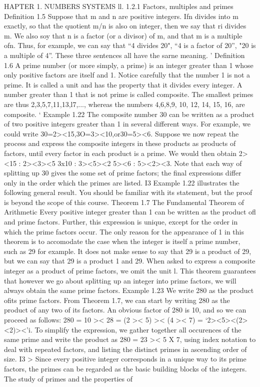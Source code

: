 HAPTER 1. NUMBERS SYSTEMS ll.
1.2.1 Factors, multiples and primes
Deﬁnition 1.5 Suppose that m and n are positive integers. Ifn divides into m exactly, so that
the quotient m/n is also on integer, then we say that ri divides m. We also soy that n is a factor
(or a divisor) of m, and that m is a multiple ofn.
Thus, for example, we can say that “4 divides 20", “4 is a factor of 20”, "20 is a multiple of 4”.
These three sentences all have the sarne meaning. '
Deﬁnition 1.6 A prime number (or more simply, a prime) is an integer greater than 1 whose
only positive factors are itself and 1.
Notice carefully that the number 1 is not a prime. It is called a unit and has the property that
it divides every integer. A number greater than 1 that is not prime is called composite. The
smallest primes are thus 2,3,5,7,11,13,l7,..., whereas the numbers 4,6,8,9, 10, 12, 14, 15, 16, 
are composite. ‘
Example 1.22 The composite number 30 can be written as a product of two positive integers
greater than 1 in several different ways. For example, we could write
30=2><15,3O=3><10,or30=5><6.
Suppose we now repeat the process and express the composite integers in these products as products
of factors, until every factor in each product is a prime. We would then obtain
2><15 : 2><3><5
3x10 : 3><5><2
5><6 : 5><2><3.
Note that each way of splitting up 30 gives the some set of prime factors; the ﬁnal expressions
differ only in the order which the primes are listed. I3
Example 1.22 illustrates the following general result. You should be familiar with its statement,
but the proof is beyond the scope of this course.
Theorem 1.7 The Fundamental Theorem of Arithmetic Every positive integer greater than
1 can be written as the product ofl and prime factors. Further, this expression is unique, except
for the order in which the prime factors occur.
The only reason for the appearance of 1 in this theorem is to accomodate the case when the integer
is itself a prime number, such as 29 for example. It does not make sense to say that 29 is a product
of 29, but we can say that 29 is a product 1 and 29. When asked to express a composite integer
as a product of prime factors, we omit the unit l. This theorem guarantees that however we go
about splitting up an integer into prime factors, we will always obtain the same prime factors.
Example 1.23 We write 280 as the product ofits prime factors. From Theorem 1.7, we can start
by writing 280 as the product of any two of its factors. An obvious factor of 280 is 10, and so we
can proceed as follows:
280 = 10 >< 28
= (2 >< 5) >< (4 >< 7)
= ‘2><5><(2><2)><'i.
To simplify the expression, we gather together all occurences of the same prime and write the
product as
280 = 23 >< 5 X 7,
using index notation to deal with repeated factors, and listing the distinct primes in ascending
order of size. I3 >
Since every positive integer corresponds in a unique way to its prime factors, the primes can be
regarded as the basic building blocks of the integers. The study of primes and the properties of



